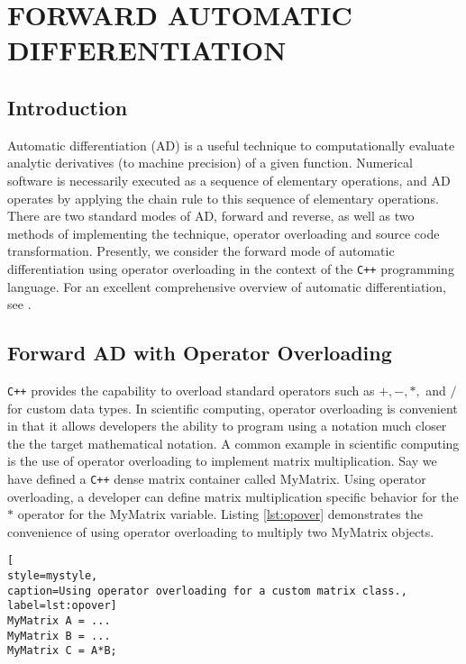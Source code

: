 \chapter{FORWARD AUTOMATIC DIFFERENTIATION}
\label{chap:fad}

\section{Introduction}

Automatic differentiation (AD) is a useful technique to computationally
evaluate analytic derivatives (to machine precision) of a given function.
Numerical software is necessarily executed as a sequence of elementary
operations, and AD operates by applying the chain rule to this sequence
of elementary operations. There are two standard modes of AD, forward and
reverse, as well as two methods of implementing the technique, operator
overloading and source code transformation. Presently, we consider the
forward mode of automatic differentiation using operator overloading in the
context of the \texttt{C++} programming language. For an excellent
comprehensive overview of automatic differentiation, see
\cite{griewank2008evaluating}.

\section{Forward AD with Operator Overloading}

\texttt{C++} provides the capability to overload standard operators such as
$+,-,*,$ and $/$ for custom data types. In scientific computing, operator
overloading is convenient in that it allows developers the ability to program
using a notation much closer the the target mathematical notation. A common
example in scientific computing is the use of operator overloading to implement
matrix multiplication. Say we have defined a \texttt{C++} dense matrix
container called MyMatrix. Using operator overloading, a developer can define
matrix multiplication specific behavior for the $*$ operator for the MyMatrix
variable. Listing \ref{lst:opover} demonstrates the convenience of using
operator overloading to multiply two MyMatrix objects.
%
\begin{lstlisting}[
style=mystyle,
caption=Using operator overloading for a custom matrix class.,
label=lst:opover]
MyMatrix A = ...
MyMatrix B = ...
MyMatrix C = A*B;
\end{lstlisting}
%

